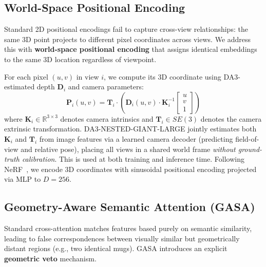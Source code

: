 \subsection{World-Space Positional Encoding}

Standard 2D positional encodings fail to capture cross-view relationships: the same 3D point projects to different pixel coordinates across views. We address this with \textbf{world-space positional encoding} that assigns identical embeddings to the same 3D location regardless of viewpoint.

For each pixel $(u, v)$ in view $i$, we compute its 3D coordinate using DA3-estimated depth $\mathbf{D}_i$ and camera parameters:
\begin{equation}
\mathbf{P}_i(u,v) = \mathbf{T}_i \cdot \left( \mathbf{D}_i(u,v) \cdot \mathbf{K}_i^{-1} \begin{bmatrix} u \\ v \\ 1 \end{bmatrix} \right)
\label{eq:unproject}
\end{equation}
where $\mathbf{K}_i \in \mathbb{R}^{3\times3}$ denotes camera intrinsics and $\mathbf{T}_i \in SE(3)$ denotes the camera extrinsic transformation. DA3-NESTED-GIANT-LARGE jointly estimates both $\mathbf{K}_i$ and $\mathbf{T}_i$ from image features via a learned camera decoder (predicting field-of-view and relative pose), placing all views in a shared world frame \emph{without ground-truth calibration}. This is used at both training and inference time. Following NeRF~\cite{nerf}, we encode 3D coordinates with sinusoidal positional encoding projected via MLP to $D=256$.


\subsection{Geometry-Aware Semantic Attention (GASA)}
\label{sec:gasa}

Standard cross-attention matches features based purely on semantic similarity, leading to false correspondences between visually similar but geometrically distant regions (e.g., two identical mugs). GASA introduces an explicit \textbf{geometric veto} mechanism.

